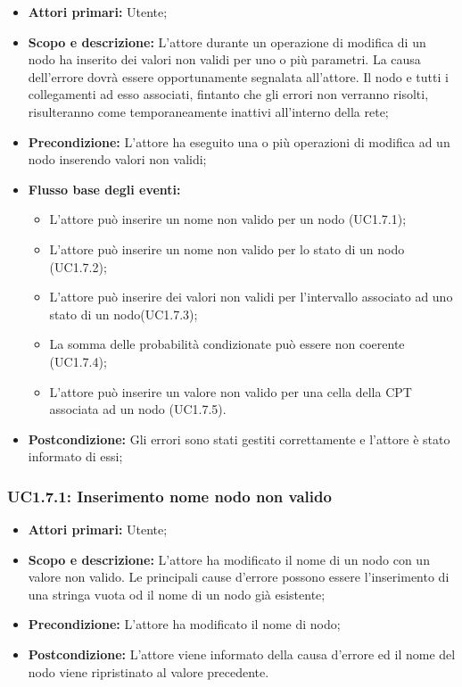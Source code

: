 \begin{itemize} 
	\item{\textbf{Attori primari:} Utente;} 
	\item{\textbf{Scopo e descrizione:} L'attore durante un operazione di modifica di un nodo ha inserito dei valori non validi per uno o più parametri. La causa dell'errore dovrà essere opportunamente segnalata all'attore. Il nodo e tutti i collegamenti ad esso associati, fintanto che gli errori non verranno risolti, risulteranno come temporaneamente inattivi all'interno della rete;} 
	\item{\textbf{Precondizione:} L'attore ha eseguito una o più operazioni di modifica ad un nodo inserendo valori non validi;} 
	\item{\textbf{Flusso base degli eventi:} } 
	\begin{itemize} 
	\item{L'attore può inserire un nome non valido per un nodo (UC1.7.1);} 
	\item{L'attore può inserire un nome non valido per lo stato di un nodo (UC1.7.2);} 
	\item{L'attore può inserire dei valori non validi per l'intervallo associato ad uno stato di un nodo(UC1.7.3);} 
	\item{La somma delle probabilità condizionate può essere non coerente (UC1.7.4);} 
	\item{L'attore può inserire un valore non valido per una cella della CPT associata ad un nodo (UC1.7.5).} 
	\end{itemize} 
	\item{\textbf{Postcondizione:} Gli errori sono stati gestiti correttamente e l'attore è stato informato di essi;} 
\end{itemize} 
\subsubsection{UC1.7.1: Inserimento nome nodo non valido} 
\begin{itemize} 
	\item{\textbf{Attori primari:} Utente;} 
	\item{\textbf{Scopo e descrizione:} L'attore ha modificato il nome di un nodo con un valore non valido. Le principali cause d'errore possono essere l'inserimento di una stringa vuota od il nome di un nodo già esistente;} 
	\item{\textbf{Precondizione:} L'attore ha modificato il nome di nodo;} 
	\item{\textbf{Postcondizione:} L'attore viene informato della causa d'errore ed il nome del nodo viene ripristinato al valore precedente.} 
\end{itemize} 
